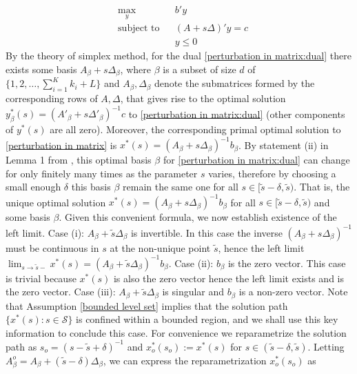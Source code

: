 \documentclass[mnsc,blindrev]{informs4} %
\begin{document}
\begin{equation}\label{perturbation in matrix:dual}
\begin{aligned}
    &\max_{y}&&b'y\\
    &\text{subject to}&&(A+s\Delta)'y= c\\
    &&&y\leq 0
\end{aligned}
\end{equation}
By the theory of simplex method, for the dual \eqref{perturbation in matrix:dual} there exists some basis $A_{\beta}+s\Delta_{\beta}$, where $\beta$ is a subset of size $d$ of $\{1,2,\ldots,\sum_{i=1}^Kk_i+L\}$ and $A_{\beta},\Delta_{\beta}$ denote the submatrices formed by the corresponding rows of $A,\Delta$, that gives rise to the optimal solution $y_{\beta}^*(s)=(A'_{\beta}+s\Delta'_{\beta})^{-1}c$ to \eqref{perturbation in matrix:dual} (other components of $y^*(s)$ are all zero). Moreover, the corresponding primal optimal solution to \eqref{perturbation in matrix} is $x^*(s)=(A_{\beta}+s\Delta_{\beta})^{-1}b_{\beta}$. By statement (ii) in Lemma 1 from \cite{freund1985postoptimal}, this optimal basis $\beta$ for \eqref{perturbation in matrix:dual} can change for only finitely many times as the parameter $s$ varies, therefore by choosing a small enough $\delta$ this basis $\beta$ remain the same one for all $s\in [\tilde s-\delta,\tilde s)$. That is, the unique optimal solution $x^*(s)=(A_{\beta}+s\Delta_{\beta})^{-1}b_{\beta}$ for all $s\in [\tilde s-\delta,\tilde s)$ and some basis $\beta$. Given this convenient formula, we now establish existence of the left limit. Case (i): $A_{\beta}+\tilde s\Delta_{\beta}$ is invertible. In this case the inverse $(A_{\beta}+s\Delta_{\beta})^{-1}$ must be continuous in $s$ at the non-unique point $\tilde s$, hence the left limit $\lim_{s\to \tilde s-}x^*(s)=(A_{\beta}+\tilde s\Delta_{\beta})^{-1}b_{\beta}$. Case (ii): $b_{\beta}$ is the zero vector. This case is trivial because $x^*(s)$ is also the zero vector hence the left limit exists and is the zero vector. Case (iii): $A_{\beta}+\tilde s\Delta_{\beta}$ is singular and $b_{\beta}$ is a non-zero vector. Note that Assumption \ref{bounded level set} implies that the solution path $\{x^*(s):s\in\mathcal S\}$ is confined within a bounded region, and we shall use this key information to conclude this case. For convenience we reparametrize the solution path as $s_o=(s-\tilde s+\delta)^{-1}$ and $x^*_o(s_o):=x^*(s)$ for $s\in(\tilde s -\delta,\tilde s)$. Letting $A_{\beta}^o=A_{\beta}+(\tilde s-\delta)\Delta_{\beta}$, we can express the reparametrization $x^*_o(s_o)$ as
\end{document}

